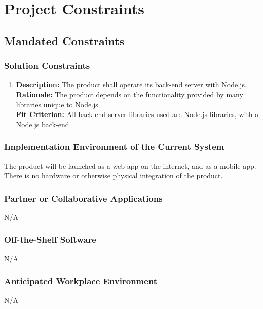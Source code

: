\documentclass[12pt]{article}
\begin{document}
\section{Project Constraints}
\subsection{Mandated Constraints} 
\subsubsection{Solution Constraints}
\begin{enumerate}
	\item
	\textbf{Description: } The product shall operate its back-end server with Node.js. \\
	\textbf{Rationale: } The product depends on the functionality provided by many libraries unique to Node.js. \\
	\textbf{Fit Criterion: } All back-end server libraries used are Node.js libraries, with a Node.js back-end. \\
\end{enumerate}
\subsubsection{Implementation Environment of the Current System}
The product will be launched as a web-app on the internet, and as a mobile app. There is no hardware or otherwise physical integration of the product.
\subsubsection{Partner or Collaborative Applications}
N/A
\subsubsection{Off-the-Shelf Software}
N/A
\subsubsection{Anticipated Workplace Environment}
N/A
\end{document}
